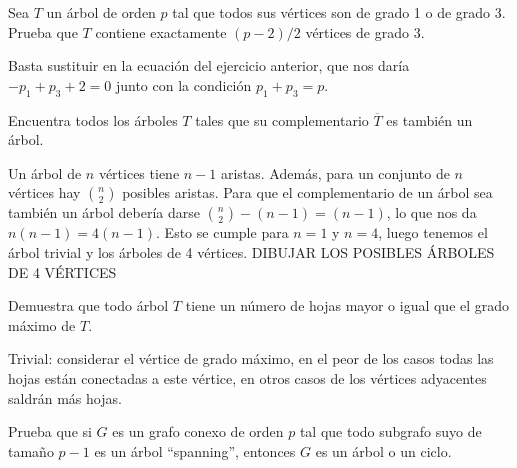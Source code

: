 \documentclass[twoside]{article}
\begin{document}
\newpage

\begin{ejercicio}{1.3}

Sea $T$ un árbol de orden $p$ tal que todos sus vértices son de grado 1 o de grado 3. Prueba
que $T$ contiene exactamente $(p - 2)/2$ vértices de grado 3.
\end{ejercicio}
\begin{solucion}
Basta sustituir en la ecuación del ejercicio anterior, que nos daría $-p_1+p_3+2=0$ junto con la condición $p_1+p_3=p$. 
\end{solucion}

\newpage

\begin{ejercicio}{1.4}

Encuentra todos los árboles $T$ tales que su complementario $\overline{T}$ es también un árbol.
\end{ejercicio}
\begin{solucion}
Un árbol de $n$ vértices tiene $n-1$ aristas. Además, para un conjunto de $n$ vértices hay $\binom{n}{2}$ posibles aristas. Para que el complementario de un árbol sea también un árbol debería darse $\binom{n}{2}-(n-1)=(n-1)$, lo que nos da $n(n-1)=4(n-1)$. Esto se cumple para $n=1$ y $n=4$, luego tenemos el árbol trivial y los árboles de 4 vértices. DIBUJAR LOS POSIBLES ÁRBOLES DE 4 VÉRTICES

\end{solucion}

\newpage

\begin{ejercicio}{1.5}

Demuestra que todo árbol $T$ tiene un número de hojas mayor o igual que el grado máximo
de $T$.
\end{ejercicio}
\begin{solucion}
Trivial: considerar el vértice de grado máximo, en el peor de los casos todas las hojas están conectadas a este vértice, en otros casos de los vértices adyacentes saldrán más hojas. 
\end{solucion}

\newpage

\begin{ejercicio}{1.6}
Prueba que si $G$ es un grafo conexo de orden $p$ tal que todo subgrafo suyo de tamaño
$p -1$ es un árbol ``spanning'', entonces $G$ es un árbol o un ciclo.
\end{ejercicio}
\begin{solucion}
\end{solucion}
\end{document}

